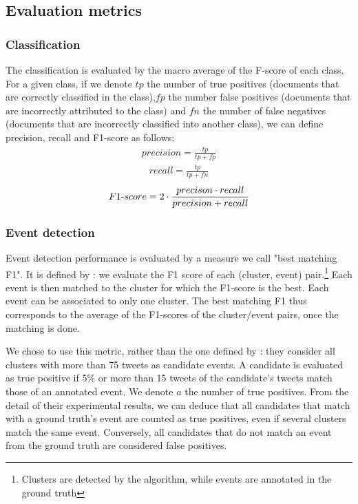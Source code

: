 \subsection{Evaluation metrics}

\subsubsection{Classification}
The classification is evaluated by the macro average of the F-score of each class. For a given class, if we denote $tp$ the number of true positives (documents that are correctly classified in the class),$fp$ the number false positives (documents that are incorrectly attributed to the class) and $fn$ the number of false negatives (documents that are incorrectly classified into another class), we can define precision, recall and F1-score as follows:
\begin{align}
precision = \frac{tp}{tp+fp}
\end{align}
\begin{align}
recall = \frac{tp}{tp+fn}
\end{align}
\begin{align}
F1{\text -}score = 2 \cdot \frac{precison \cdot recall}{precision + recall}
\end{align}

\subsubsection{Event detection}

Event detection performance is evaluated by a measure we call "best matching F1". It is defined by \citet{yang1998study}: we evaluate the F1 score of each (cluster, event) pair.\footnote{Clusters are detected by the algorithm, while events are annotated in the ground truth} Each event is then matched to the cluster for which the F1-score is the best. Each event can be associated to only one cluster. The best matching F1 thus corresponds to the average of the F1-scores of the cluster/event pairs, once the matching is done.

We chose to use this metric, rather than the one defined by \citet{mcminn_real_2015}: they consider all clusters with more than 75 tweets as candidate events. A candidate is evaluated as true positive if 5\% or more than 15 tweets of the candidate's tweets match those of an annotated event. We denote $a$ the number of true positives. From the detail of their experimental results, we can deduce that all candidates that match with a ground truth's event are counted as true positives, even if several clusters match the same event. Conversely, all candidates that do not match an event from the ground truth are considered false positives. 

